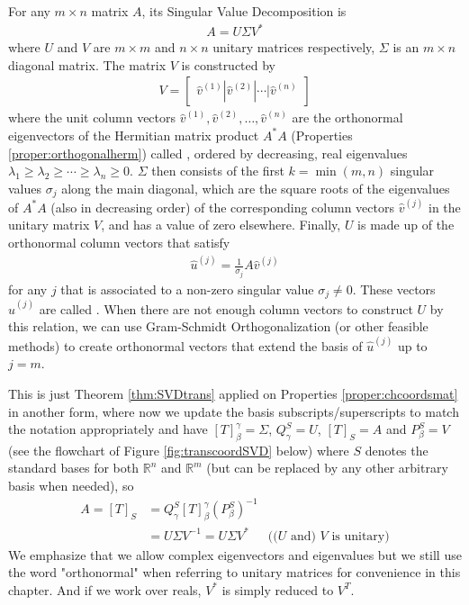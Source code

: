 \begin{thm}
\label{thm:SVD}
For any $m \times n$ matrix $A$, its Singular Value Decomposition is
\begin{align}
A = U\Sigma V^*
\end{align}
where $U$ and $V$ are $m \times m$ and $n \times n$ unitary matrices respectively, $\Sigma$ is an $m \times n$ diagonal matrix. The matrix $V$ is constructed by
\begin{align}
V = 
\begin{bmatrix}
\hat{v}^{(1)} | \hat{v}^{(2)} | \cdots | \hat{v}^{(n)}
\end{bmatrix}
\end{align}
where the unit column vectors $\hat{v}^{(1)}, \hat{v}^{(2)}, \ldots, \hat{v}^{(n)}$ are the orthonormal eigenvectors of the Hermitian matrix product $A^*A$ (Properties \ref{proper:orthogonalherm}) called , ordered by decreasing, real eigenvalues $\lambda_1 \geq \lambda_2 \geq \cdots \geq \lambda_n \geq 0$. $\Sigma$ then consists of the first $k = \min(m,n)$ singular values $\sigma_j$  along the main diagonal, which are the square roots of the eigenvalues of $A^*A$ (also in decreasing order) of the corresponding column vectors $\hat{v}^{(j)}$ in the unitary matrix $V$, and has a value of zero elsewhere. Finally, $U$ is made up of the orthonormal column vectors that satisfy
\begin{align}
\hat{u}^{(j)} = \frac{1}{\sigma_j} A\hat{v}^{(j)}
\end{align}
for any $j$ that is associated to a non-zero singular value $\sigma_j \neq 0$. These vectors $\hat{u}^{(j)}$ are called . When there are not enough column vectors to construct $U$ by this relation, we can use Gram-Schmidt Orthogonalization (or other feasible methods) to create orthonormal vectors that extend the basis of $\hat{u}^{(j)}$ up to $j = m$.
\end{thm}
This is just Theorem \ref{thm:SVDtrans} applied on Properties \ref{proper:chcoordsmat} in another form, where now we update the basis subscripts/superscripts to match the notation appropriately and have $[T]^{\gamma}_{\beta} = \Sigma$, $Q_{\gamma}^{S} = U$, $[T]_{S} = A$ and $P_{\beta}^{S} = V$ (see the flowchart of Figure \ref{fig:transcoordSVD} below) where $S$ denotes the standard bases for both $\mathbb{R}^n$ and $\mathbb{R}^m$ (but can be replaced by any other arbitrary basis when needed), so
\begin{align*}
A = [T]_S &= Q_{\gamma}^{S}[T]^{\gamma}_{\beta}(P_{\beta}^{S})^{-1} \\
&= U\Sigma V^{-1} = U\Sigma V^* & \text{(($U$ and) $V$ is unitary)}
\end{align*}
We emphasize that we allow complex eigenvectors and eigenvalues but we still use the word "orthonormal" when referring to unitary matrices for convenience in this chapter. And if we work over reals, $V^*$ is simply reduced to $V^T$.

